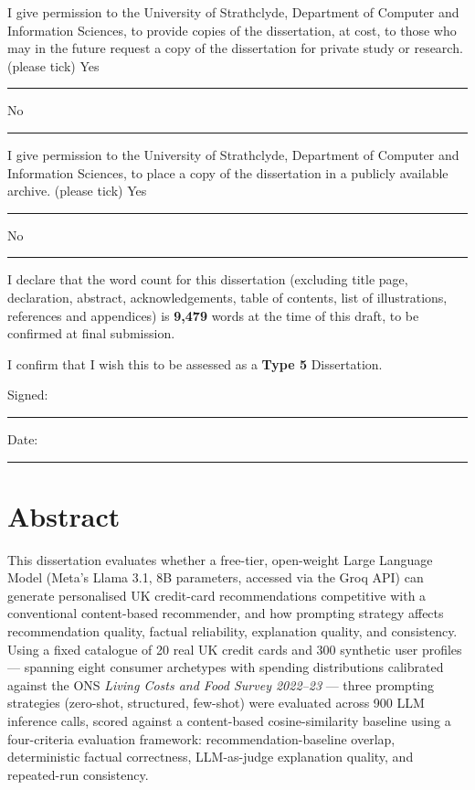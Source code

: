 I give permission to the University of Strathclyde, Department of Computer and Information Sciences, to provide copies of the dissertation, at cost, to those who may in the future request a copy of the dissertation for private study or research. \hfill (please tick) Yes \rule{0.8cm}{0.4pt} \; No \rule{0.8cm}{0.4pt}

I give permission to the University of Strathclyde, Department of Computer and Information Sciences, to place a copy of the dissertation in a publicly available archive. \hfill (please tick) Yes \rule{0.8cm}{0.4pt} \; No \rule{0.8cm}{0.4pt}

I declare that the word count for this dissertation (excluding title page, declaration, abstract, acknowledgements, table of contents, list of illustrations, references and appendices) is \textbf{9,479} words at the time of this draft, to be confirmed at final submission.

I confirm that I wish this to be assessed as a \textbf{Type 5} Dissertation.

\vspace{2cm}
\noindent Signed: \rule{5cm}{0.4pt} \hfill Date: \rule{4cm}{0.4pt}

\chapter*{Abstract}

This dissertation evaluates whether a free-tier, open-weight Large Language Model (Meta's Llama 3.1, 8B parameters, accessed via the Groq API) can generate personalised UK credit-card recommendations competitive with a conventional content-based recommender, and how prompting strategy affects recommendation quality, factual reliability, explanation quality, and consistency. Using a fixed catalogue of 20 real UK credit cards and 300 synthetic user profiles --- spanning eight consumer archetypes with spending distributions calibrated against the ONS \textit{Living Costs and Food Survey 2022--23} --- three prompting strategies (zero-shot, structured, few-shot) were evaluated across 900 LLM inference calls, scored against a content-based cosine-similarity baseline using a four-criteria evaluation framework: recommendation-baseline overlap, deterministic factual correctness, LLM-as-judge explanation quality, and repeated-run consistency.

